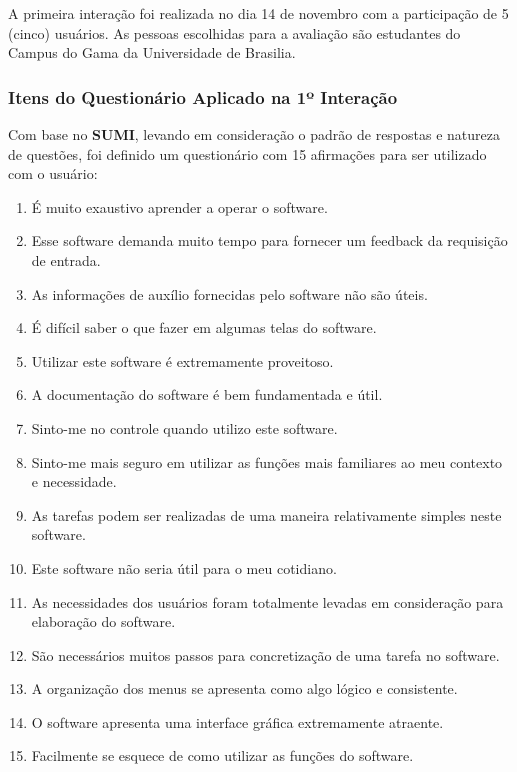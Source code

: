 			A primeira interação foi realizada no dia 14 de novembro com a participação de 5 (cinco) usuários. As pessoas escolhidas para a avaliação são estudantes do Campus do Gama da Universidade de Brasilia.

			\subsubsection[Itens do Questionário Aplicados na 1º Interação]{Itens do Questionário Aplicado na 1º Interação}
			\label{sec:terceiraAvaliacao_1_Questionario}

				Com base no \textbf{SUMI}, levando em consideração o padrão de respostas e natureza de questões, foi definido um questionário com 15 afirmações para ser utilizado com o usuário:

				\begin{enumerate}
					\item{É muito exaustivo aprender a operar o software.}
					\item{Esse software demanda muito tempo para fornecer um feedback da requisição de entrada.}
					\item{As informações de auxílio fornecidas pelo software não são úteis.}
					\item{É difícil saber o que fazer em algumas telas do software.}
					\item{Utilizar este software é extremamente proveitoso.}
					\item{A documentação do software é bem fundamentada e útil.}
					\item{Sinto-me no controle quando utilizo este software.}
					\item{Sinto-me mais seguro em utilizar as funções mais familiares ao meu contexto e necessidade.}
					\item{As tarefas podem ser realizadas de uma maneira relativamente simples neste software.}
					\item{Este software não seria útil para o meu cotidiano.}
					\item{As necessidades dos usuários foram totalmente levadas em consideração para elaboração do software.}
					\item{São necessários muitos passos para concretização de uma tarefa no software.}
					\item{A organização dos menus se apresenta como algo lógico e consistente.}
					\item{O software apresenta uma interface gráfica extremamente atraente.}
					\item{Facilmente se esquece de como utilizar as funções do software.}
				\end{enumerate}

